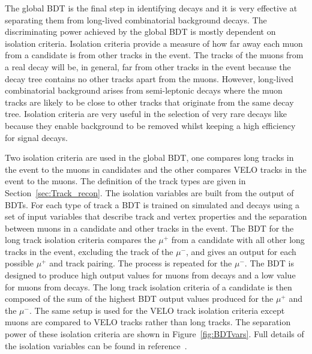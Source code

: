 The global BDT is the final step in identifying \bmumu decays and it is very effective at separating them from long-lived combinatorial background decays. The discriminating power achieved by the global BDT is mostly dependent on isolation criteria. Isolation criteria provide a measure of how far away each muon from a \bmumu candidate is from other tracks in the event. The tracks of the muons from a real \bmumu decay will be, in general, far from other tracks in the event because the \bmumu decay tree contains no other tracks apart from the muons. However, long-lived combinatorial background arises from semi-leptonic decays where the muon tracks are likely to be close to other tracks that originate from the same decay tree. %
Isolation criteria are very useful in the selection of very rare decays like \bsmumu because they enable background to be removed whilst keeping a high efficiency for signal decays.

Two isolation criteria are used in the global BDT, one compares long tracks in the event to the muons in \bmumu candidates and the other compares VELO tracks in the event to the muons. The definition of the track types are given in Section~\ref{sec:Track_recon}. The isolation variables are built from the output of BDTs. For each type of track a BDT is trained on simulated \bsmumu and \bbbarmumux decays using a set of input variables that describe track and vertex properties and the separation between muons in a \bsmumu candidate and other tracks in the event. 
The BDT for the long track isolation criteria compares the $\mu^{+}$ from a \bsmumu candidate with all other long tracks in the event, excluding the track of the $\mu^{-}$, and gives an output for each possible $\mu^{+}$ and track pairing. The process is repeated for the $\mu^{-}$. The BDT is designed to produce high output values for muons from \bbbarmumux decays and a low value for muons from \bsmumu decays. The long track isolation criteria of a \bsmumu candidate is then composed of the sum of the highest BDT output values produced for the $\mu^{+}$ and the $\mu^{-}$. The same setup is used for the VELO track isolation criteria except muons are compared to VELO tracks rather than long tracks. The separation power of these isolation criteria are shown in Figure~\ref{fig:BDTvars}. Full details of the isolation variables can be found in reference~\cite{Archilli:1970886}.


